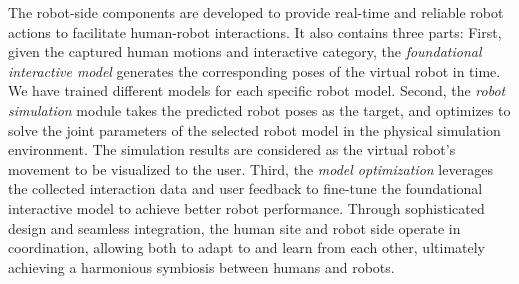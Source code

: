 The robot-side components are developed to provide real-time and reliable robot actions to facilitate human-robot interactions. It also contains three parts: First, given the captured human motions and interactive category, the \emph{foundational interactive model} generates the corresponding poses of the virtual robot in time. We have trained different models for each specific robot model. Second, the \emph{robot simulation} module takes the predicted robot poses as the target, and optimizes to solve the joint parameters of the selected robot model in the physical simulation environment. The simulation results are considered as the virtual robot's movement to be visualized to the user. Third, the \emph{model optimization} leverages the collected interaction data and user feedback to fine-tune the foundational interactive model to achieve better robot performance. Through sophisticated design and seamless integration, the human site and robot side operate in coordination, allowing both to adapt to and learn from each other, ultimately achieving a harmonious symbiosis between humans and robots.




